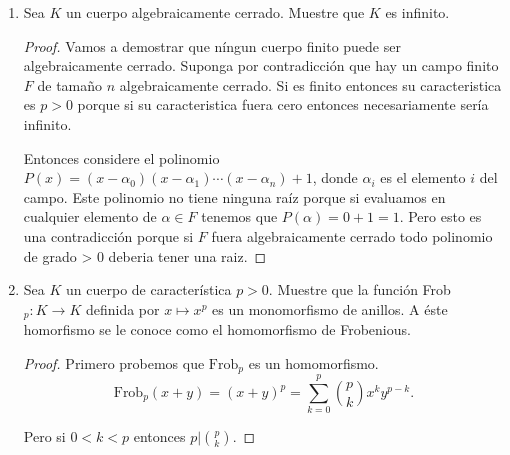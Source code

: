 \documentclass[letter,twoside,12pt]{article}
\begin{document}
\begin{enumerate}
\begin{enumerate}
\item Muestre que el poligono regular de 9 lados, Eneágono, no se puede construir con regla y compas. Equivalentemente el ángulo $ \frac{2\pi}{3} $ no puede ser trisecado.

\begin{proof}
Los dos puntos anteriores nos permiten concluir que $ \alpha = 2\cos\Big(\frac{2\pi}{9}\Big) \not \in \mathbb{Q} $ porque es una raíz del polinomio pero ya vimos que este polinomio no tiene ráices en $ \mathbb{Q} $.

Por lo tanto tenemos que $ [\mathbb{Q}(\alpha):\mathbb{Q}]=3 $. Pero esto implica que el punto no puede contruirse con regla y compas, porque no es posible que ella una cadena de extensiones de grado 2 entre esta extensión y $ \mathbb{Q} $.
\end{proof}
\end{enumerate}

\item Sea $ K $ un cuerpo algebraicamente cerrado. Muestre que $ K $ es infinito.
\begin{proof}
Vamos a demostrar que níngun cuerpo finito puede ser algebraicamente cerrado. Suponga por contradicción que hay un campo finito $ F $ de tamaño $ n $ algebraicamente cerrado. Si es finito entonces su caracteristica es $ p>0 $ porque si su caracteristica fuera cero entonces necesariamente sería infinito.

Entonces considere el polinomio $ P(x)=(x-\alpha_0)(x-\alpha_1)\cdots(x-\alpha_n)+1 $, donde $ \alpha_i $ es el elemento $ i $ del campo. Este polinomio no tiene ninguna raíz porque si evaluamos en cualquier elemento de $ \alpha \in F $ tenemos que $ P(\alpha)=0+1=1 $. Pero esto es una contradicción porque si $ F $ fuera algebraicamente cerrado todo polinomio de grado > 0 deberia tener una raiz.
\end{proof}
\item Sea $ K $ un cuerpo de característica $ p > 0 $. Muestre que la función Frob$ _p  : K \to K $ definida por $ x \mapsto x^p $ es
un monomorfismo de anillos. A éste homorfismo se le conoce como el homomorfismo de Frobenious.

\begin{proof}
Primero probemos que $ \text{Frob}_p $ es un homomorfismo.
\begin{equation}
\text{Frob}_p(x+y)=(x+y)^p=\sum_{k=0}^p \binom{p}{k}x^ky^{p-k}. \nonumber
\end{equation}

Pero si $ 0<k<p $ entonces $ p|\binom{p}{k} $.


\end{proof}
\end{enumerate}
\end{document}
